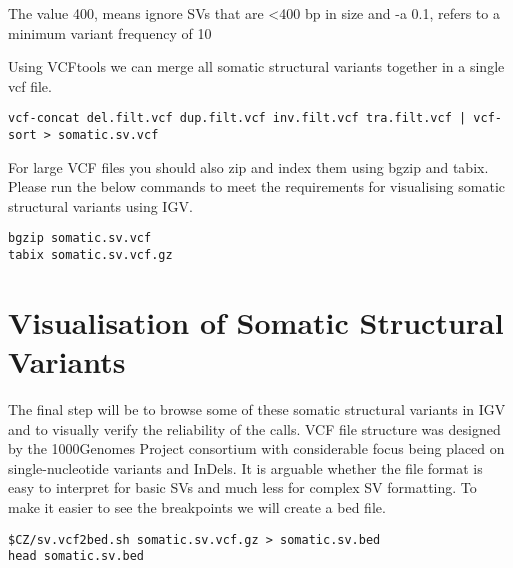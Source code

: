 \begin{note}
The value 400, means ignore SVs that are <400 bp in size and -a 0.1, refers to a minimum variant frequency of 10%
\end{note}

\begin{steps}
Using VCFtools we can merge all somatic structural variants together in a single vcf file.
\begin{lstlisting}
vcf-concat del.filt.vcf dup.filt.vcf inv.filt.vcf tra.filt.vcf | vcf-sort > somatic.sv.vcf
\end{lstlisting}
\end{steps}

\begin{information}
For large VCF files you should also zip and index them using bgzip and tabix. Please run the below commands to meet the requirements for visualising somatic structural variants using IGV.  
\end{information}

\begin{steps}
\begin{lstlisting}
bgzip somatic.sv.vcf
tabix somatic.sv.vcf.gz
\end{lstlisting}
\end{steps}



\section{Visualisation of Somatic Structural Variants}

\begin{information}
The final step will be to browse some of these somatic structural variants in IGV and to visually verify the reliability of the calls. VCF file structure was designed by the 1000Genomes Project consortium with considerable focus being placed on single-nucleotide variants and InDels. It is arguable whether the file format is easy to interpret for basic SVs and much less for complex SV formatting. To make it easier to see the breakpoints we will create a bed file. 

\end{information}
\begin{steps}
\begin{lstlisting}
$CZ/sv.vcf2bed.sh somatic.sv.vcf.gz > somatic.sv.bed
head somatic.sv.bed
\end{lstlisting}
\end{steps}


